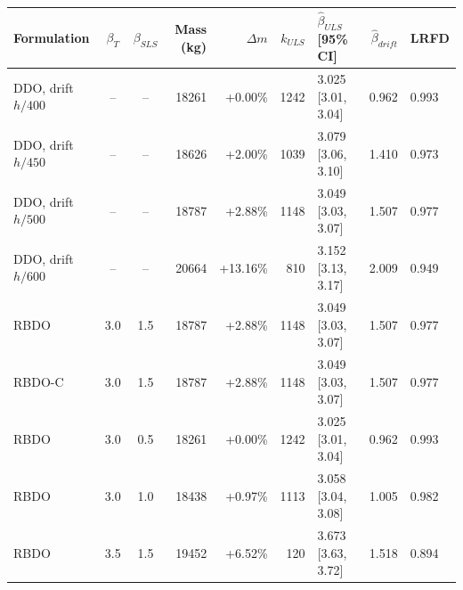 \begin{tabular}{lccrrrlrl}
\toprule
Formulation & $\beta_T$ & $\beta_{SLS}$ & Mass (kg) & $\Delta m$ & $k_{ULS}$ & $\hat\beta_{ULS}$ [95\% CI] & $\hat\beta_{drift}$ & LRFD \\
\midrule
DDO, drift $h/400$ & -- & -- & 18261 & +0.00\% & 1242 & 3.025 [3.01, 3.04] & 0.962 & 0.993 \\
DDO, drift $h/450$ & -- & -- & 18626 & +2.00\% & 1039 & 3.079 [3.06, 3.10] & 1.410 & 0.973 \\
DDO, drift $h/500$ & -- & -- & 18787 & +2.88\% & 1148 & 3.049 [3.03, 3.07] & 1.507 & 0.977 \\
DDO, drift $h/600$ & -- & -- & 20664 & +13.16\% & 810 & 3.152 [3.13, 3.17] & 2.009 & 0.949 \\
RBDO & 3.0 & 1.5 & 18787 & +2.88\% & 1148 & 3.049 [3.03, 3.07] & 1.507 & 0.977 \\
RBDO-C & 3.0 & 1.5 & 18787 & +2.88\% & 1148 & 3.049 [3.03, 3.07] & 1.507 & 0.977 \\
RBDO & 3.0 & 0.5 & 18261 & +0.00\% & 1242 & 3.025 [3.01, 3.04] & 0.962 & 0.993 \\
RBDO & 3.0 & 1.0 & 18438 & +0.97\% & 1113 & 3.058 [3.04, 3.08] & 1.005 & 0.982 \\
RBDO & 3.5 & 1.5 & 19452 & +6.52\% & 120 & 3.673 [3.63, 3.72] & 1.518 & 0.894 \\
\bottomrule
\end{tabular}